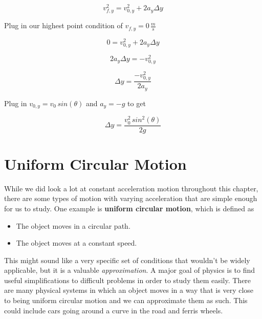 \documentclass[12pt]{book}
\begin{document}
\begin{equation}
v_{f,y}^2 = v_{0,y}^2 + 2 a_y \Delta y
\end{equation}

Plug in our highest point condition of $v_{f,y} = 0 \, \frac{m}{s}$

\begin{equation}
0 = v_{0,y}^2 + 2 a_y \Delta y
\end{equation}

\begin{equation}
2 a_y \Delta y = - v_{0,y}^2
\end{equation}

\begin{equation}
\Delta y = \frac{-v_{0,y}^2}{2 a_y}
\end{equation}

Plug in $v_{0,y} = v_0 \, sin(\theta)$ and $a_y = -g$ to get

\begin{equation}
\Delta y = \frac{v_0^2 \, sin^2 (\theta)}{2 g}
\end{equation}

\section{Uniform Circular Motion}

While we did look a lot at constant acceleration motion throughout this chapter, there are some types of motion with varying acceleration that are simple enough for us to study. One example is \textbf{uniform circular motion}, which is defined as

\begin{itemize}
\item The object moves in a circular path.
\item The object moves at a constant speed.
\end{itemize}

This might sound like a very specific set of conditions that wouldn't be widely applicable, but it is a valuable \textit{approximation}. A major goal of physics is to find useful simplifications to difficult problems in order to study them easily. There are many physical systems in which an object moves in a way that is very close to being uniform circular motion and we can approximate them as such. This could include cars going around a curve in the road and ferris wheels.
\end{document}

